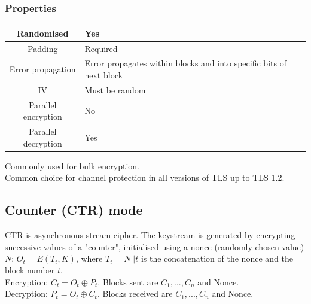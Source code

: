 \documentclass{article}
\begin{document}
\subsubsection{Properties}

\begin{center}
\begin{tabular}{ | c | p{5cm} | } 
\hline
Randomised & Yes \\
\hline
Padding & Required \\ 
\hline
Error propagation & Error propagates within blocks and into specific bits of next block \\ 
\hline
IV & Must be random \\ 
\hline
Parallel encryption & No \\ 
\hline
Parallel decryption & Yes \\ 
\hline
\end{tabular}
\end{center}

Commonly used for bulk encryption.\\
Common choice for channel protection in all versions of TLS up to TLS 1.2.

\subsection{Counter (CTR) mode}

CTR is asynchronous stream cipher. The keystream is generated by encrypting successive values of a "counter", initialised using a nonce (randomly chosen value) $N$: $O_t = E(T_t, K)$, where $T_t = N \vert \vert t$ is the concatenation of the nonce and the block number $t$.\\
Encryption: $C_t = O_t \oplus P_t$. Blocks sent are $C_1, ..., C_n$ and Nonce.\\
Decryption: $P_t = O_t \oplus C_t$. Blocks received are $C_1, ..., C_n$ and Nonce.\\
\end{document}
